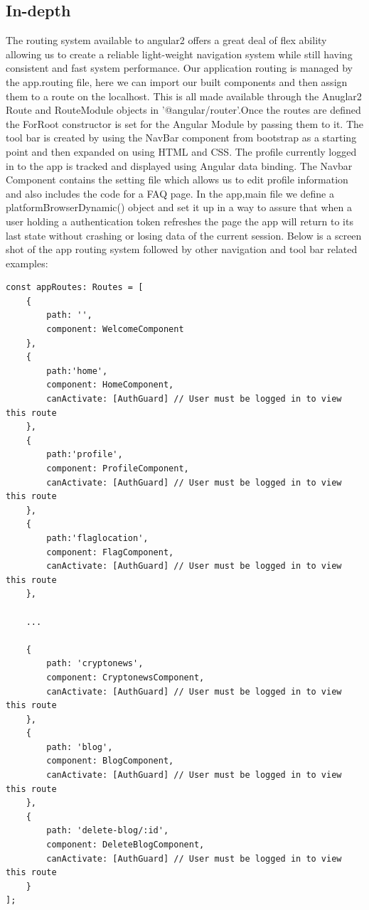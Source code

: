 \subsection{In-depth}
The routing system available to angular2 offers a great deal of flex ability allowing us to create a reliable light-weight navigation system while still having consistent and fast system performance. Our application routing is managed by the app.routing file, here we can import our built components and then assign them to a route on the localhost. This is all made available through the Anuglar2 Route and RouteModule objects in '@angular/router'.Once the routes are defined the ForRoot constructor is set for the Angular Module by passing them to it. The tool bar is created by using the NavBar component from bootstrap as a starting point and then expanded on using HTML and CSS. The profile currently logged in to the app is tracked and displayed using Angular data binding. The Navbar Component contains the setting file which allows us to edit profile information and also includes the code for a FAQ page. In the app,main file we define a platformBrowserDynamic() object and set it up in a way to assure that when a user holding a authentication token refreshes the page the app will return to its last state without crashing or losing data of the current session. Below is a screen shot of the app routing system followed by other navigation and tool bar related examples:

\begin{lstlisting}
const appRoutes: Routes = [
    {
        path: '',
        component: WelcomeComponent
    },
    {
        path:'home',
        component: HomeComponent,
        canActivate: [AuthGuard] // User must be logged in to view this route
    },
    {
        path:'profile',
        component: ProfileComponent,
        canActivate: [AuthGuard] // User must be logged in to view this route
    },
    {
        path:'flaglocation',
        component: FlagComponent,
        canActivate: [AuthGuard] // User must be logged in to view this route
    },
    
    ...
    
    {
        path: 'cryptonews',
        component: CryptonewsComponent,
        canActivate: [AuthGuard] // User must be logged in to view this route
    },
    {
        path: 'blog',
        component: BlogComponent,
        canActivate: [AuthGuard] // User must be logged in to view this route
    },
    {
        path: 'delete-blog/:id',
        component: DeleteBlogComponent,
        canActivate: [AuthGuard] // User must be logged in to view this route
    }
];
    
\end{lstlisting}

